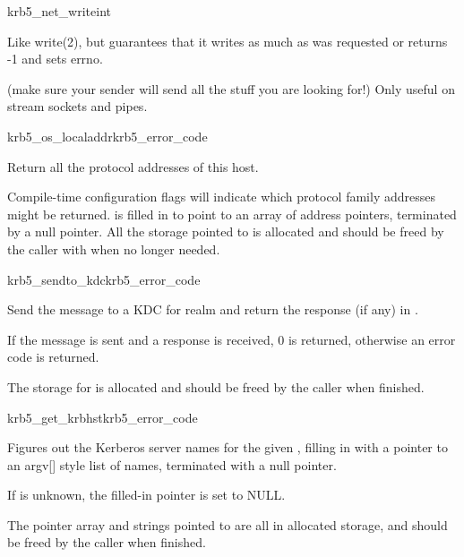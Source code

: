 \begin{funcdecl}{krb5_net_write}{int}{\funcin}
\end{funcdecl}

Like write(2), but guarantees that it writes as much as was requested
or returns -1 and sets errno.

(make sure your sender will send all the stuff you are looking for!)
Only useful on stream sockets and pipes.

\begin{funcdecl}{krb5_os_localaddr}{krb5_error_code}{\funcout}
\end{funcdecl}

Return all the protocol addresses of this host.

Compile-time configuration flags will indicate which protocol family
addresses might be returned.
 is filled in to point to an array of address pointers,
terminated by a null pointer.  All the storage pointed to is allocated
and should be freed by the caller with 
when no longer needed.


\begin{funcdecl}{krb5_sendto_kdc}{krb5_error_code}{\funcin}
\funcout
{}
\end{funcdecl}

Send the message  to a KDC for realm  and
return the response (if any) in .

If the message is sent and a response is received, 0 is returned,
otherwise an error code is returned.

The storage for  is allocated and should be freed by
the caller when finished.

\begin{funcdecl}{krb5_get_krbhst}{krb5_error_code}{\funcin}
\funcout
{}
\end{funcdecl}

Figures out the Kerberos server names for the given ,
filling in
 with a
pointer to an argv[] style list of names, terminated with a null
pointer.
 
If  is unknown, the filled-in pointer is set to NULL.

The pointer array and strings pointed to are all in allocated storage,
and should be freed by the caller when finished.

